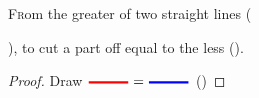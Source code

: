 	\pagestyle{euclidprob}
    \begin{prop}{\lettrine[lines=2]{F}rom}
		the greater of two straight lines (
			), to cut a part off equal to the less (\tikzhline[blue]{1cm}).\par

	\end{prop}
	\begin{proof}
		Draw $\tikzhline[red]{1cm} = \tikzhline[blue]{1cm}$ ()

	\end{proof}
